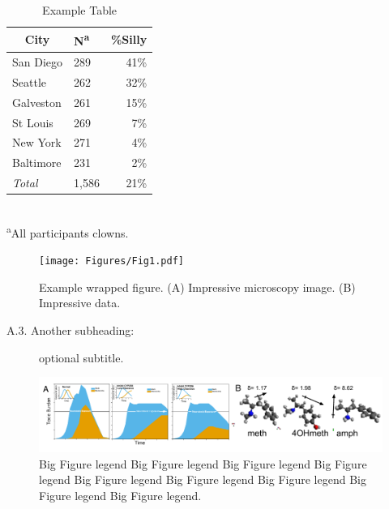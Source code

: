 \documentclass[11pt,notitlepage]{article}
\begin{document}
\begin{table} %
\caption{Example Table}
\begin{center}
\begin{tabular}{l l r}
\toprule
\multicolumn{1}{c}{City} & {N\textsuperscript{a}} & {\%Silly}\\
\midrule
San Diego & 289 & 41\%\\
Seattle & 262 & 32\%\\
Galveston & 261 & 15\%\\
St Louis & 269 & 7\%\\
New York & 271 & 4\%\\
Baltimore & 231 & 2\%\\
\emph{Total} & 1,586 & 21\%\\
\hline
\end{tabular}\\
\footnotesize\textsuperscript{a}{All participants clowns.}
\end{center}
\label{default}
\end{table}

\lipsum[8-10]

\begin{figure} %
\texttt{[image: Figures/Fig1.pdf]}
\caption{\footnotesize Example wrapped figure. (A) Impressive microscopy image. (B) Impressive data.}
\end{figure}

\lipsum[5]

\begin{description}
\item[A.3. Another subheading:]{optional subtitle.}
\end{description}

\lipsum[25]

\begin{figure}[b c] %
\centering
\includegraphics[scale = .80]{Figures/Fig2.pdf}
\caption{\footnotesize Big Figure legend Big Figure legend Big Figure legend Big Figure legend Big Figure legend Big Figure legend Big Figure legend Big Figure legend Big Figure legend.}
\label{fig2}
\end{figure}
\end{document}
